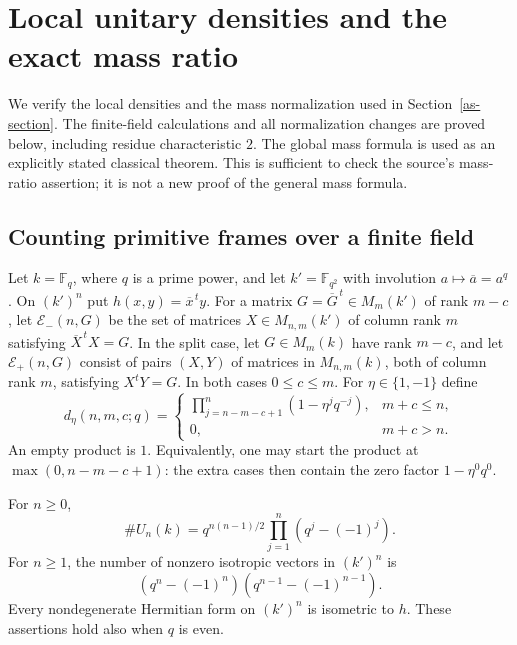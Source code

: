 \section{Local unitary densities and the exact mass ratio}
\label{md-section}

We verify the local densities and the mass normalization used in
Section~\ref{as-section}. The finite-field calculations and all
normalization changes are proved below, including residue
characteristic $2$. The global mass formula is used as an explicitly
stated classical theorem. This is sufficient to check the source's
mass-ratio assertion; it is not a new proof of the general mass formula.

\subsection{Counting primitive frames over a finite field}

Let $k=\mathbb F_q$, where $q$ is a prime power, and let
$k'=\mathbb F_{q^2}$ with involution $a\mapsto\overline a=a^q$.
On $(k')^n$ put $h(x,y)=\overline x^{\,t}y$.
For a matrix $G=\overline G^{\,t}\in M_m(k')$ of rank $m-c$, let
$\mathcal E_-(n,G)$ be the set of matrices $X\in M_{n,m}(k')$
of column rank $m$ satisfying $\overline X^{\,t}X=G$.
In the split case, let $G\in M_m(k)$ have rank $m-c$, and let
$\mathcal E_+(n,G)$ consist of pairs $(X,Y)$ of matrices in
$M_{n,m}(k)$, both of column rank $m$, satisfying $X^tY=G$.
In both cases $0\leq c\leq m$.
For $\eta\in\{1,-1\}$ define
\begin{equation}\label{md-density}
 d_\eta(n,m,c;q)=
 \begin{cases}
 \displaystyle\prod_{j=n-m-c+1}^{n}(1-\eta^j q^{-j}),&m+c\leq n,\\
 0,&m+c>n.
 \end{cases}
\end{equation}
An empty product is $1$. Equivalently, one may start the product at
$\max(0,n-m-c+1)$: the extra cases then contain the zero factor
$1-\eta^0q^0$.

\begin{lemma}\label{md-unitary-order}
For $n\geq0$,
\[
 \#U_n(k)=q^{n(n-1)/2}\prod_{j=1}^n(q^j-(-1)^j).
\]
For $n\geq1$, the number of nonzero isotropic vectors in $(k')^n$ is
\[
                  (q^n-(-1)^n)(q^{n-1}-(-1)^{n-1}).
\]
Every nondegenerate Hermitian form on $(k')^n$ is isometric to $h$.
These assertions hold also when $q$ is even.
\end{lemma}

